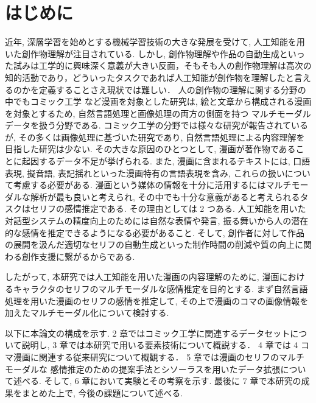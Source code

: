 \newpage
\changeindent{0cm}
\section{はじめに}
\changeindent{2cm}
近年, 深層学習を始めとする機械学習技術の大きな発展を受けて, 人工知能を用いた創作物理解が注目されている.
しかし, 創作物理解や作品の自動生成といった試みは工学的に興味深く意義が大きい反面，そもそも人の創作物理解は高次の知的活動であり，どういったタスクであれば人工知能が創作物を理解したと言えるのかを定義することさえ現状では難しい．
人の創作物の理解に関する分野の中でもコミック工学 \cite{comic} など漫画を対象とした研究は,
絵と文章から構成される漫画を対象とするため, 自然言語処理と画像処理の両方の側面を持つ
マルチモーダルデータを扱う分野である.
コミック工学の分野では様々な研究が報告されているが,
その多くは画像処理に基づいた研究であり,
自然言語処理による内容理解を目指した研究は少ない.
その大きな原因のひとつとして, 漫画が著作物であることに起因するデータ不足が挙げられる.
また, 漫画に含まれるテキストには, 口語表現, 擬音語, 表記揺れといった漫画特有の言語表現を含み,
これらの扱いについて考慮する必要がある.
漫画という媒体の情報を十分に活用するにはマルチモーダルな解析が最も良いと考えられ, その中でも十分な意義があると考えられるタスクはセリフの感情推定である. その理由としては 2 つある. 人工知能を用いた対話型システムの精度向上のためには自然な表情や発言, 振る舞いから人の潜在的な感情を推定できるようになる必要があること. そして, 創作者に対して作品の展開を汲んだ適切なセリフの自動生成といった制作時間の削減や質の向上に関わる創作支援に繋がるからである.

したがって, 本研究では人工知能を用いた漫画の内容理解のために,
漫画におけるキャラクタのセリフのマルチモーダルな感情推定を目的とする.
まず自然言語処理を用いた漫画のセリフの感情を推定して,
その上で漫画のコマの画像情報を加えたマルチモーダル化について検討する.

以下に本論文の構成を示す.
2 章ではコミック工学に関連するデータセットについて説明し,
3 章では本研究で用いる要素技術について概説する．
4 章では 4 コマ漫画に関連する従来研究について概観する．
5 章では漫画のセリフのマルチモーダルな
感情推定のための提案手法とシソーラスを用いたデータ拡張について述べる.
そして, 6 章において実験とその考察を示す.
最後に 7 章で本研究の成果をまとめた上で, 今後の課題について述べる.
